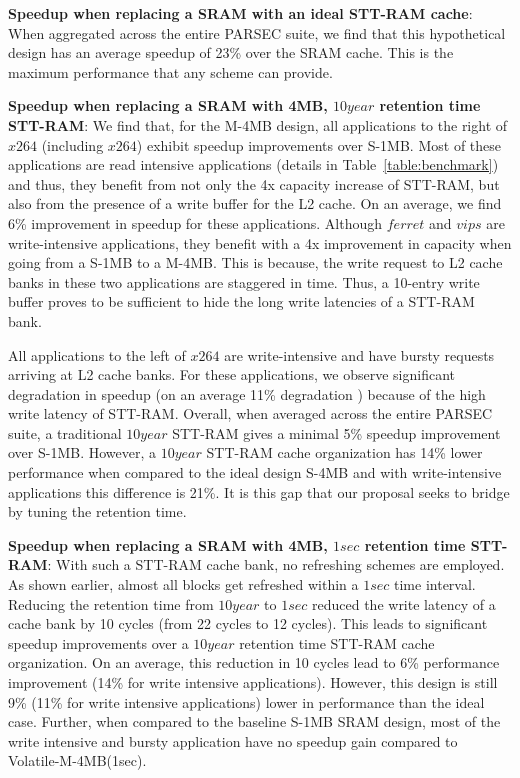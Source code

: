 {\bf Speedup when replacing a SRAM with an ideal STT-RAM cache}: When aggregated across the entire PARSEC suite, we find that this hypothetical design has an average speedup of 23\% over the SRAM cache. This is the maximum performance that any scheme can provide.

{\bf Speedup when replacing a SRAM with 4MB, $10year$ retention time STT-RAM}: We find that, for the M-4MB design, all applications to the right of $x264$ (including $x264$) exhibit speedup improvements over S-1MB. Most of these applications are read intensive applications (details in Table~\ref{table:benchmark}) and thus, they benefit from not only the 4x capacity increase of STT-RAM, but also from the presence of a write buffer for the L2 cache. On an average, we find 6\% improvement in speedup for these applications. Although $ferret$ and $vips$ are write-intensive applications, they benefit with a 4x improvement in capacity when going from a S-1MB to a M-4MB. This is because, the write request to L2 cache banks in these two applications are staggered in time. Thus, a 10-entry write buffer proves to be sufficient to hide the long write latencies of a STT-RAM bank.

All applications to the left of $x264$ are write-intensive and have bursty requests arriving at L2 cache banks. For these applications, we observe significant degradation in speedup (on an average 11\% degradation ) because of the high write latency of STT-RAM.
Overall, when averaged across the entire PARSEC suite, a traditional $10year$ STT-RAM gives a minimal 5\% speedup improvement over S-1MB. However, a $10year$ STT-RAM cache organization has 14\% lower performance when compared to the ideal design S-4MB and with write-intensive applications this difference is 21\%. It is this gap that our proposal seeks to bridge by tuning the retention time.

{\bf Speedup when replacing a SRAM with 4MB, $1sec$ retention time STT-RAM}: With such a STT-RAM cache bank, no refreshing schemes are employed. As shown earlier, almost all blocks get refreshed within a $1sec$ time interval. Reducing the retention time from $10year$ to $1sec$ reduced the write latency of a cache bank by 10 cycles (from 22 cycles to 12 cycles). This leads to significant speedup improvements over a $10year$ retention time STT-RAM cache organization. On an average, this reduction in 10 cycles lead to 6\% performance improvement (14\% for write intensive applications). However, this design is still 9\% (11\% for write intensive applications) lower in performance than the ideal case.
Further, when compared to the baseline S-1MB SRAM design, most of the write intensive and bursty application have no speedup gain compared to
Volatile-M-4MB(1sec).

